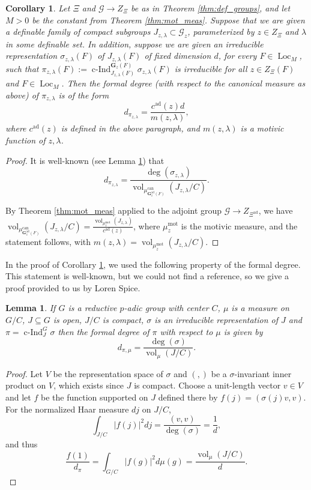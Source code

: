 \documentclass{amsart}
\newcommand{\cF}{\mathcal{F}}
\newcommand{\cG}{\mathcal{G}}
\DeclareMathOperator{\vol}{vol}
\DeclareMathOperator{\loc}{Loc}
\DeclareMathOperator{\ind}{c-Ind}
\newcommand{\bG}{\mathbf{G}}
\newcommand{\can}{\mathrm{can}}
\newcommand\mot{\mathrm{mot}}
\newcommand\ad{\mathrm{ad}}
\theoremstyle{plain}
\newtheorem{lem}[thm]{Lemma}
\newtheorem{cor}[thm]{Corollary}
\theoremstyle{definition}
\begin{document}
\begin{cor} \label{cor:form_deg} Let $\Xi$ 
and $\cG \to Z_\Xi$ be as in Theorem \ref{thm:def_groups}, and let $M>0$ be the constant from Theorem \ref{thm:mot_meas}.
Suppose that we are given a definable family of compact subgroups $J_{z, \lambda} \subset \cG_z$,
parameterized by $z \in Z_\Xi$ and $\lambda$ in some definable set.
In addition, suppose we are given an irreducible representation  
$\sigma_{z, \lambda}(F)$ of $J_{z, \lambda}(F)$ of fixed dimension $d$, for every $F\in \loc_M$, such 
that $\pi_{z,\lambda}(F) := \ind_{J_{z,\lambda}(F)}^{\bG_z(F)} \sigma_{z,\lambda}(F)$
is irreducible for all $z \in Z_\Xi(F)$ and $F \in \loc_M$.
Then the formal degree (with respect to the canonical measure as above) of $\pi_{z, \lambda}$ is of the form 
\[
d_{\pi_{z, \lambda}}=\frac{c^\ad(z)d}{m(z, \lambda)},
\]
where $c^\ad(z)$ is defined in the above paragraph, and 
$m(z, \lambda)$ is a motivic function of $z, \lambda$. 
\end{cor}
\begin{proof}
It is well-known (see Lemma \ref{lem:well-known}) that
\begin{equation}\label{eq:well-known}
d_{\pi_{z, \lambda}}=\frac{\deg(\sigma_{z, \lambda})}{\vol_{\mu_{\bG_z^\ad(F)}^\can}(J_{z, \lambda}/C)}.
\end{equation}

By Theorem \ref{thm:mot_meas} applied to the adjoint group $\cG\to Z_{\Xi^\ad}$, we have $\vol_{\mu_{\bG_z^\ad(F)}^\can}(J_{z, \lambda}/C) = \frac{\vol_{\mu^\mot_z}(J_{z, \lambda})}{c^\ad(z)}$, where $\mu^\mot_z$ is the motivic measure, 
and the statement follows, with $m(z, \lambda)=\vol_{\mu^\mot_z}(J_{z, \lambda}/C)$.
\end{proof}

In the proof of Corollary \ref{cor:form_deg}, we used the following property of the formal degree.
This statement is well-known, but we could not find a reference, so we give a proof provided to us by Loren Spice.

\begin{lem} \label{lem:well-known}
If $G$ is a reductive $p$-adic group with center $C$, $\mu$ is a measure on $G/C$, $J \subseteq G$ is open, $J/C$ is compact,
$\sigma$ is an irreducible representation of $J$ and $\pi = \ind_J^G \sigma$ then the formal degree of $\pi$ with respect to $\mu$ is given by
\[
d_{\pi,\mu} = \frac{\deg(\sigma)}{\vol_\mu(J/C)}.
\]
\end{lem}
\begin{proof}
Let $V$ be the representation space of $\sigma$ and $(,)$ be a $\sigma$-invariant
inner product on $V$, which exists since $J$ is compact.
Choose a unit-length vector $v \in V$ and let $f$ be the function supported on $J$
defined there by $f(j) = (\sigma(j)v,v)$.  For the normalized Haar measure $dj$ on $J/C$,
\[
\int_{J/C} \lvert f(j)\rvert^2 dj = \frac{(v,v)}{\deg(\sigma)} = \frac{1}{d},
\]
and thus
\[
\frac{f(1)}{d_\pi} = \int_{G/C} \lvert f(g) \rvert^2 d\mu(g) = \frac{\vol_\mu(J/C)}{d}.
\]
\end{proof}
\end{document}
